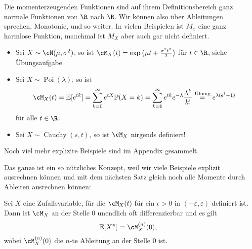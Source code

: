 Die momenterzeugenden Funktionen sind auf ihrem Definitionsbereich ganz normale Funktionen von $\R$ nach $\R$. Wir k\"onnen also \"uber Ableitungen sprechen, Monotonie, und so weiter. In vielen Beispielen ist $M_x$ eine ganz harmlose Funktion, manchmal ist $M_X$ aber auch gar nicht definiert.
\begin{beispiel1}\abs
\begin{itemize}
	\item Sei $X \sim \cN(\mu, \sigma^2)$, so ist $\cM_X(t) = \exp\big(\mu t + \frac{\sigma^2 t^2}{2}\big)$ f\"ur $t\in\R$, siehe \"Ubungsaufgabe.
	\item Sei $X\sim \operatorname{Poi}(\lambda)$, so ist $$\cM_X(t) = \mathbb{E}[e^{tk}] = \sum\limits_{k=0}^{\infty} e^{tX} \mathbb{P}(X = k) = \sum\limits_{k=0}^{\infty} e^{tk} e^{-\lambda} \frac{\lambda^k}{k!} \overset{\text{Übung}}{=} e^{\lambda(e^t - 1)}$$ f\"ur alle $t\in\R$.
	\item Sei $ X \sim \operatorname{Cauchy}(s,t)$, so ist $\cM_X$ nirgends definiert!
	\end{itemize}
Noch viel mehr explizite Beispiele sind im Appendix gesammelt.
\end{beispiel1}

Das ganze ist ein so n\"utzliches Konzept, weil wir viele Beispiele explizit ausrechnen k\"onnen und mit dem n\"achsten Satz gleich noch alle Momente durch Ableiten ausrechnen k\"onnen:

\begin{satz}
	Sei $X$ eine Zufallsvariable, f\"ur die $\cM_X(t)$ f\"ur ein $\epsilon>0$ in $(-\varepsilon, \varepsilon)$ definiert ist. Dann ist $\cM_X$ an der Stelle $0$ unendlich oft differenzierbar und es gilt $$\mathbb{E}[X^n] = \cM_X^{(n)}(0),$$ wobei $\cM_X^{(n)}(0)$ die $n$-te Ableitung an der Stelle $0$ ist.
\end{satz}